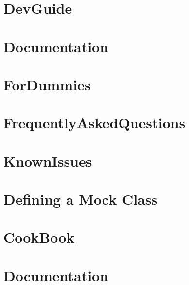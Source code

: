 \documentclass[twoside]{book}
\newcommand{\+}{\discretionary{\mbox{\scriptsize$\hookleftarrow$}}{}{}}
\begin{document}
\chapter{Dev\+Guide}
\label{md_vendor_googletest_googlemock_docs_DevGuide}

\chapter{Documentation}
\label{md_vendor_googletest_googlemock_docs_Documentation}

\chapter{For\+Dummies}
\label{md_vendor_googletest_googlemock_docs_ForDummies}

\chapter{Frequently\+Asked\+Questions}
\label{md_vendor_googletest_googlemock_docs_FrequentlyAskedQuestions}

\chapter{Known\+Issues}
\label{md_vendor_googletest_googlemock_docs_KnownIssues}

\chapter{Defining a Mock Class}
\label{md_vendor_googletest_googlemock_docs_v1_5_CheatSheet}

\chapter{Cook\+Book}
\label{md_vendor_googletest_googlemock_docs_v1_5_CookBook}

\chapter{Documentation}
\label{md_vendor_googletest_googlemock_docs_v1_5_Documentation}

\end{document}
